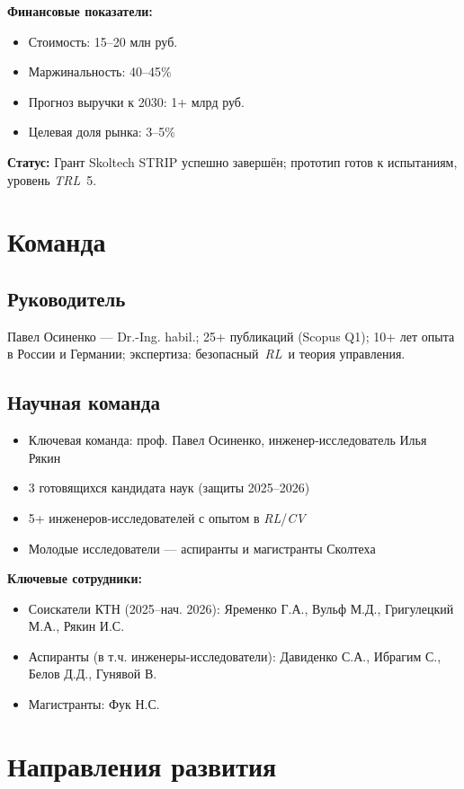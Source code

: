 \documentclass[12pt,a4paper]{article}
\begin{document}
\textbf{Финансовые показатели:}
\begin{itemize}
    \item Стоимость: 15–20 млн руб.
    \item Маржинальность: 40–45\%
    \item Прогноз выручки к 2030: 1+ млрд руб.
    \item Целевая доля рынка: 3–5\%
\end{itemize}
\textbf{Статус:} Грант Skoltech STRIP успешно завершён; прототип готов к испытаниям, уровень \textit{TRL}~5.

\section{Команда}
\subsection*{Руководитель}
Павел Осиненко --- Dr.-Ing. habil.; 25+ публикаций (Scopus Q1); 10+ лет опыта в России и Германии; экспертиза: безопасный~\textit{RL}\ и теория управления. %

\subsection*{Научная команда}
\begin{itemize}
    \item Ключевая команда: проф. Павел Осиненко, инженер‑исследователь Илья Рякин
    \item 3 готовящихся кандидата наук (защиты 2025–2026)
    \item 5+ инженеров‑исследователей с опытом в \textit{RL}/\textit{CV}
    \item Молодые исследователи — аспиранты и магистранты Сколтеха
\end{itemize}
\textbf{Ключевые сотрудники:}
\begin{itemize}
    \item Соискатели КТН (2025–нач. 2026): Яременко Г.А., Вульф М.Д., Григулецкий М.А., Рякин И.С.
    \item Аспиранты (в т.ч. инженеры-исследователи): Давиденко С.А., Ибрагим С., Белов Д.Д., Гунявой В.
    \item Магистранты: Фук Н.С.
\end{itemize}

\section{Направления развития}
\end{document}
